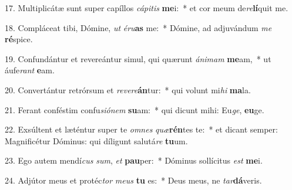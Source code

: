 17. Multiplicátæ sunt super capíllos \textit{cá}\textit{pi}\textit{tis} \textbf{me}i:~*  et cor meum de\textit{re}\textbf{lí}quit me.\

18. Compláceat tibi, Dómine, \textit{ut} \textit{é}\textit{ru}\textbf{as} me:~*  Dómine, ad adjuvándum \textit{me} \textbf{ré}spice.\

19. Confundántur et revereántur simul, qui quærunt \textit{á}\textit{ni}\textit{mam} \textbf{me}am,~*  ut áufe\textit{rant} \textbf{e}am.\

20. Convertántur retrórsum et \textit{re}\textit{ve}\textit{re}\textbf{án}tur:~*  qui volunt mi\textit{hi} \textbf{ma}la.\

21. Ferant conféstim confu\textit{si}\textit{ó}\textit{nem} \textbf{su}am:~*  qui dicunt mihi: Eu\textit{ge}, \textbf{eu}ge.\

22. Exsúltent et læténtur super te \textit{om}\textit{nes} \textit{quæ}\textbf{rén}tes te:~*  et dicant semper: Magnificétur Dóminus: qui díligunt salutá\textit{re} \textbf{tu}um.\

23. Ego autem mendí\textit{cus} \textit{sum}, \textit{et} \textbf{pau}per:~*  Dóminus sollícitus \textit{est} \textbf{me}i.\

24. Adjútor meus et protéc\textit{tor} \textit{me}\textit{us} \textbf{tu} es:~*  Deus meus, ne \textit{tar}\textbf{dá}veris.\

